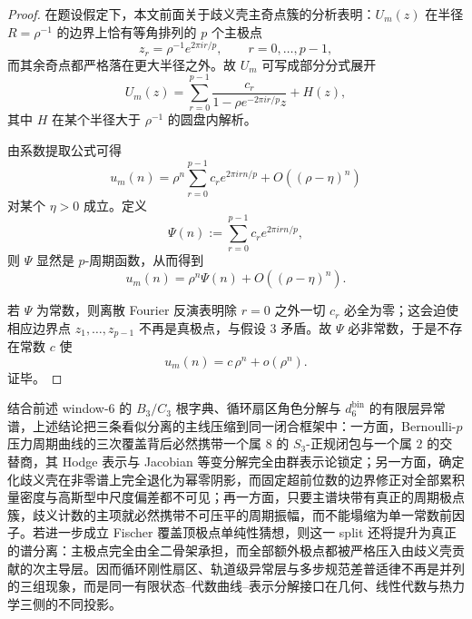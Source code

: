 \begin{proof}
在题设假定下，本文前面关于歧义壳主奇点簇的分析表明：\(U_m(z)\) 在半径 \(R=\rho^{-1}\) 的边界上恰有等角排列的 \(p\) 个主极点
\[
z_r=\rho^{-1}e^{2\pi i r/p},
\qquad r=0,\dots,p-1,
\]
而其余奇点都严格落在更大半径之外。故 \(U_m\) 可写成部分分式展开
\[
U_m(z)=\sum_{r=0}^{p-1}\frac{c_r}{1-\rho e^{-2\pi i r/p}z}+H(z),
\]
其中 \(H\) 在某个半径大于 \(\rho^{-1}\) 的圆盘内解析。

由系数提取公式可得
\[
u_m(n)=\rho^n\sum_{r=0}^{p-1}c_r e^{2\pi i rn/p}+O((\rho-\eta)^n)
\]
对某个 \(\eta>0\) 成立。定义
\[
\Psi(n):=\sum_{r=0}^{p-1}c_r e^{2\pi i rn/p},
\]
则 \(\Psi\) 显然是 \(p\)-周期函数，从而得到
\[
u_m(n)=\rho^n\Psi(n)+O((\rho-\eta)^n).
\]

若 \(\Psi\) 为常数，则离散 Fourier 反演表明除 \(r=0\) 之外一切 \(c_r\) 必全为零；这会迫使相应边界点 \(z_1,\dots,z_{p-1}\) 不再是真极点，与假设 3 矛盾。故 \(\Psi\) 必非常数，于是不存在常数 \(c\) 使
\[
u_m(n)=c\,\rho^n+o(\rho^n).
\]
证毕。
\end{proof}





\noindent
结合前述 window-\(6\) 的 \(B_3/C_3\) 根字典、循环扇区角色分解与 \(d_6^{\mathrm{bin}}\) 的有限层异常谱，上述结论把三条看似分离的主线压缩到同一闭合框架中：一方面，Bernoulli-\(p\) 压力周期曲线的三次覆盖背后必然携带一个属 \(8\) 的 \(S_3\)-正规闭包与一个属 \(2\) 的交替商，其 Hodge 表示与 Jacobian 等变分解完全由群表示论锁定；另一方面，确定化歧义壳在非零谱上完全退化为幂零阴影，而固定超前位数的边界修正对全部累积量密度与高斯型中尺度偏差都不可见；再一方面，只要主谱块带有真正的周期极点簇，歧义计数的主项就必然携带不可压平的周期振幅，而不能塌缩为单一常数前因子。若进一步成立 Fischer 覆盖顶极点单纯性猜想，则这一 split 还将提升为真正的谱分离：主极点完全由全二骨架承担，而全部额外极点都被严格压入由歧义壳贡献的次主导层。因而循环刚性扇区、轨道级异常层与多步规范差普适律不再是并列的三组现象，而是同一有限状态--代数曲线--表示分解接口在几何、线性代数与热力学三侧的不同投影。

\endinput
